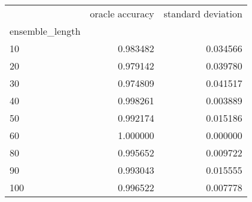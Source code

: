 \begin{tabular}{lrr}
\toprule
{} &  oracle accuracy &  standard deviation \\
ensemble\_length &                  &                     \\
\midrule
10              &         0.983482 &            0.034566 \\
20              &         0.979142 &            0.039780 \\
30              &         0.974809 &            0.041517 \\
40              &         0.998261 &            0.003889 \\
50              &         0.992174 &            0.015186 \\
60              &         1.000000 &            0.000000 \\
80              &         0.995652 &            0.009722 \\
90              &         0.993043 &            0.015555 \\
100             &         0.996522 &            0.007778 \\
\bottomrule
\end{tabular}
